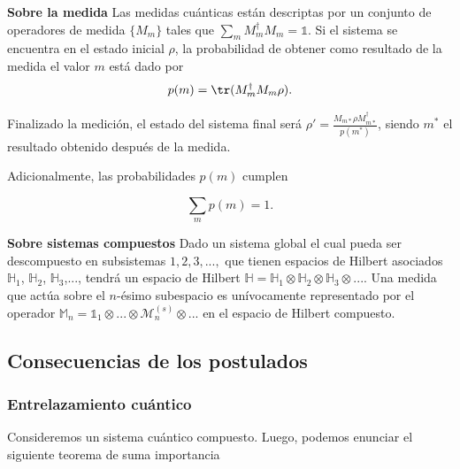 \begin{post} \label{Post measurement} \textbf{Sobre la medida} Las medidas cuánticas están descriptas por un conjunto de operadores de medida $\{M_m\}$ tales que $\sum_m M_m^{\dagger}M_m = \mathds{1}$. Si el sistema se encuentra en el estado inicial $\rho$, la probabilidad de obtener como resultado de la medida el valor $m$ está dado por 
\begin{equation}
    p(m) = \tr (M_m^{\dagger}M_m \rho).
\end{equation}

Finalizado la medición, el estado del sistema final será  $\rho' = \frac{M_{m*} \rho M_{m*}^{\dagger}}{p(m^{*})}$, siendo $m^*$ el resultado obtenido después de la medida.

\end{post}

Adicionalmente, las probabilidades $p(m)$ cumplen 

\begin{equation}
    \sum_m p(m) = 1.
\end{equation}


\begin{post} \label{Post separability}
\textbf{Sobre sistemas compuestos}
Dado un sistema global el cual pueda ser descompuesto en subsistemas $1,2,3,...,$ que tienen espacios de Hilbert asociados $\mathds{H}_1$, $\mathds{H}_2$, $\mathds{H}_3$,..., tendrá un espacio de Hilbert $\mathds{H} = \mathds{H}_1 \otimes \mathds{H}_2 \otimes \mathds{H}_3 \otimes ...$. Una medida que actúa sobre el $n$-ésimo subespacio es unívocamente representado por el operador $\mathds{M}_n = \mathds{1}_1 \otimes ... \otimes \mathcal{M}_n^{(s)} \otimes ...$ en el espacio de Hilbert compuesto. 

\end{post}
 \subsection{Consecuencias de los postulados }
 \subsubsection{Entrelazamiento cuántico}
 
 Consideremos un sistema cuántico compuesto. Luego, podemos enunciar el siguiente teorema de suma importancia
 
